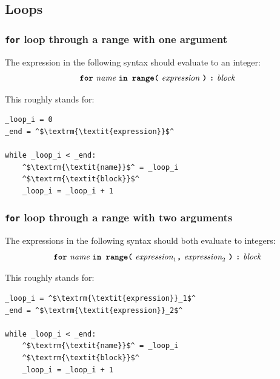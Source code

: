 \subsection*{Loops}

\subsubsection*{\texttt{\textbf{for}} loop through a range with one argument}

The expression in the following syntax should evaluate to an integer:
\[
  \textbf{\texttt{for}}\ \textit{name}\ \textbf{\texttt{in
  range(}}\ \textit{expression}\ \textbf{\texttt{)}}\ \textbf{\texttt{:}}\ \textit{block}
\]

This roughly stands for:
\begin{center}
  \begin{minipage}{90mm}
\begin{lstlisting}
_loop_i = 0
_end = ^$\textrm{\textit{expression}}$^

while _loop_i < _end:
    ^$\textrm{\textit{name}}$^ = _loop_i
    ^$\textrm{\textit{block}}$^
    _loop_i = _loop_i + 1
\end{lstlisting}
  \end{minipage}
\end{center}

\subsubsection*{\texttt{\textbf{for}} loop through a range with two arguments}

The expressions in the following syntax should both evaluate to integers:
\[
  \textbf{\texttt{for}}\ \textit{name}\ \textbf{\texttt{in
    range(}}\ \textit{expression}_1
  \textbf{\texttt{,}}\ \textit{expression}_2\ \textbf{\texttt{)}}\ \textbf{\texttt{:}}\ \textit{block}
\]

This roughly stands for:
\begin{center}
  \begin{minipage}{90mm}
\begin{lstlisting}
_loop_i = ^$\textrm{\textit{expression}}_1$^
_end = ^$\textrm{\textit{expression}}_2$^

while _loop_i < _end:
    ^$\textrm{\textit{name}}$^ = _loop_i
    ^$\textrm{\textit{block}}$^
    _loop_i = _loop_i + 1
\end{lstlisting}
  \end{minipage}
\end{center}

